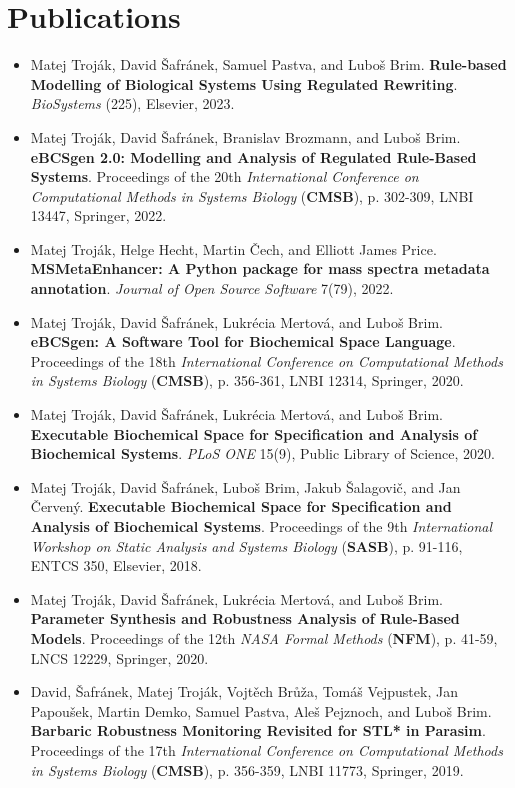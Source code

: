 \documentclass[letterpaper,11pt]{article}
\begin{document}
\section{Publications}
\vspace{2pt}
\small{
  \begin{itemize}
    \item Matej Troják, David Šafránek, Samuel Pastva, and Luboš Brim. \textbf{Rule-based Modelling of Biological Systems Using Regulated Rewriting}. \emph{BioSystems} (225), Elsevier, 2023.
    \item Matej Troják, David Šafránek, Branislav Brozmann, and Luboš Brim. \textbf{eBCSgen 2.0: Modelling and Analysis of Regulated Rule-Based Systems}. Proceedings of the 20th \emph{International Conference on Computational Methods in Systems Biology} (\textbf{CMSB}), p. 302-309, LNBI 13447, Springer, 2022.
    \item Matej Troják, Helge Hecht, Martin Čech, and Elliott James Price. \textbf{MSMetaEnhancer: A Python package for mass spectra metadata annotation}. \emph{Journal of Open Source Software} 7(79), 2022.
    \item Matej Troják, David Šafránek, Lukrécia Mertová, and Luboš Brim. \textbf{eBCSgen: A Software Tool for Biochemical Space Language}. Proceedings of the 18th \emph{International Conference on Computational Methods in Systems Biology} (\textbf{CMSB}), p. 356-361, LNBI 12314, Springer, 2020.
    \item Matej Troják, David Šafránek, Lukrécia Mertová, and Luboš Brim. \textbf{Executable Biochemical Space for Specification and Analysis of Biochemical Systems}. \emph{PLoS ONE} 15(9), Public Library of Science, 2020.
    \item Matej Troják, David Šafránek, Luboš Brim, Jakub Šalagovič, and Jan Červený. \textbf{Executable Biochemical Space for Specification and Analysis of Biochemical Systems}. Proceedings of the 9th \emph{International Workshop on Static Analysis and Systems Biology} (\textbf{SASB}), p. 91-116, ENTCS 350, Elsevier, 2018.
    \item Matej Troják, David Šafránek, Lukrécia Mertová, and Luboš Brim. \textbf{Parameter Synthesis and Robustness Analysis of Rule-Based Models}. Proceedings of the 12th \emph{NASA Formal Methods} (\textbf{NFM}), p. 41-59, LNCS 12229, Springer, 2020.
    \item David, Šafránek, Matej Troják, Vojtěch Brůža, Tomáš Vejpustek, Jan Papoušek, Martin Demko, Samuel Pastva, Aleš Pejznoch, and Luboš Brim. \textbf{Barbaric Robustness Monitoring Revisited for STL* in Parasim}. Proceedings of the 17th \emph{International Conference on Computational Methods in Systems Biology} (\textbf{CMSB}), p. 356-359, LNBI 11773, Springer, 2019. 

\end{itemize}}
\end{document}
